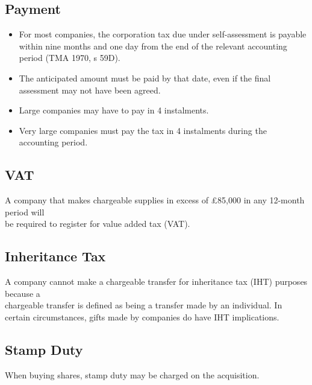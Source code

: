 \documentclass[
]{article}
\providecommand{\tightlist}{%
  \setlength{\itemsep}{0pt}\setlength{\parskip}{0pt}}
\begin{document}
\hypertarget{payment}{%
\subsection{Payment}\label{payment}}

\begin{itemize}
\tightlist
\item
  For most companies, the corporation tax due under self-assessment is
  payable within nine months and one day from the end of the relevant
  accounting period (TMA 1970, s 59D).
\item
  The anticipated amount must be paid by that date, even if the final
  assessment may not have been agreed.
\item
  Large companies may have to pay in 4 instalments.
\item
  Very large companies must pay the tax in 4 instalments during the
  accounting period.
\end{itemize}

\hypertarget{vat}{%
\subsection{VAT}\label{vat}}

A company that makes chargeable supplies in excess of £85,000 in any
12-month period will\\
be required to register for value added tax (VAT).

\hypertarget{inheritance-tax}{%
\subsection{Inheritance Tax}\label{inheritance-tax}}

A company cannot make a chargeable transfer for inheritance tax (IHT)
purposes because a\\
chargeable transfer is defined as being a transfer made by an
individual. In certain circumstances, gifts made by companies do have
IHT implications.

\hypertarget{stamp-duty}{%
\subsection{Stamp Duty}\label{stamp-duty}}

When buying shares, stamp duty may be charged on the acquisition.
\end{document}
